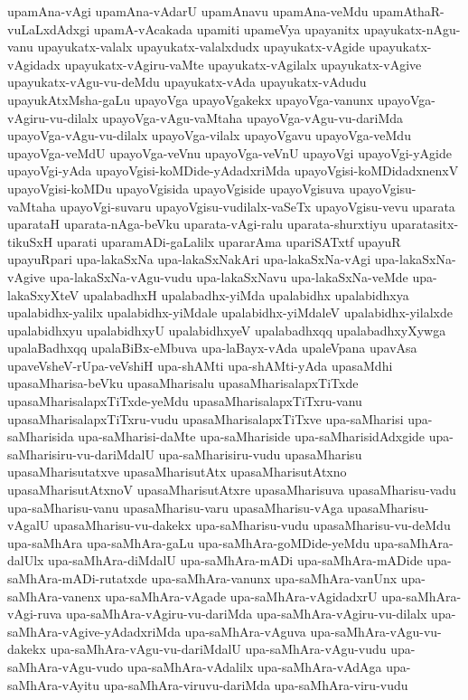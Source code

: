 {upamAna-vAgi
upamAna-vAdarU
upamAnavu
upamAna-veMdu
upamAthaR-vuLaLxdAdxgi
upamA-vAcakada
upamiti
upameVya
upayanitx
upayukatx-nAgu-vanu
upayukatx-valalx
upayukatx-valalxdudx
upayukatx-vAgide
upayukatx-vAgidadx
upayukatx-vAgiru-vaMte
upayukatx-vAgilalx
upayukatx-vAgive
upayukatx-vAgu-vu-deMdu
upayukatx-vAda
upayukatx-vAdudu
upayukAtxMsha-gaLu
upayoVga
upayoVgakekx
upayoVga-vanunx
upayoVga-vAgiru-vu-dilalx
upayoVga-vAgu-vaMtaha
upayoVga-vAgu-vu-dariMda
upayoVga-vAgu-vu-dilalx
upayoVga-vilalx
upayoVgavu
upayoVga-veMdu
upayoVga-veMdU
upayoVga-veVnu
upayoVga-veVnU
upayoVgi
upayoVgi-yAgide
upayoVgi-yAda
upayoVgisi-koMDide-yAdadxriMda
upayoVgisi-koMDidadxnenxV
upayoVgisi-koMDu
upayoVgisida
upayoVgiside
upayoVgisuva
upayoVgisu-vaMtaha
upayoVgi-suvaru
upayoVgisu-vudilalx-vaSeTx
upayoVgisu-vevu
uparata
uparataH
uparata-nAga-beVku
uparata-vAgi-ralu
uparata-shurxtiyu
uparatasitx-tikuSxH
uparati
uparamADi-gaLalilx
upararAma
upariSATxtf
upayuR
upayuRpari
upa-lakaSxNa
upa-lakaSxNakAri
upa-lakaSxNa-vAgi
upa-lakaSxNa-vAgive
upa-lakaSxNa-vAgu-vudu
upa-lakaSxNavu
upa-lakaSxNa-veMde
upa-lakaSxyXteV
upalabadhxH
upalabadhx-yiMda
upalabidhx
upalabidhxya
upalabidhx-yalilx
upalabidhx-yiMdale
upalabidhx-yiMdaleV
upalabidhx-yilalxde
upalabidhxyu
upalabidhxyU
upalabidhxyeV
upalabadhxqq
upalabadhxyXywga
upalaBadhxqq
upalaBiBx-eMbuva
upa-laBayx-vAda
upaleVpana
upavAsa
upaveVsheV-rUpa-veVshiH
upa-shAMti
upa-shAMti-yAda
upasaMdhi
upasaMharisa-beVku
upasaMharisalu
upasaMharisalapxTiTxde
upasaMharisalapxTiTxde-yeMdu
upasaMharisalapxTiTxru-vanu
upasaMharisalapxTiTxru-vudu
upasaMharisalapxTiTxve
upa-saMharisi
upa-saMharisida
upa-saMharisi-daMte
upa-saMhariside
upa-saMharisidAdxgide
upa-saMharisiru-vu-dariMdalU
upa-saMharisiru-vudu
upasaMharisu
upasaMharisutatxve
upasaMharisutAtx
upasaMharisutAtxno
upasaMharisutAtxnoV
upasaMharisutAtxre
upasaMharisuva
upasaMharisu-vadu
upa-saMharisu-vanu
upasaMharisu-varu
upasaMharisu-vAga
upasaMharisu-vAgalU
upasaMharisu-vu-dakekx
upa-saMharisu-vudu
upasaMharisu-vu-deMdu
upa-saMhAra
upa-saMhAra-gaLu
upa-saMhAra-goMDide-yeMdu
upa-saMhAra-dalUlx
upa-saMhAra-diMdalU
upa-saMhAra-mADi
upa-saMhAra-mADide
upa-saMhAra-mADi-rutatxde
upa-saMhAra-vanunx
upa-saMhAra-vanUnx
upa-saMhAra-vanenx
upa-saMhAra-vAgade
upa-saMhAra-vAgidadxrU
upa-saMhAra-vAgi-ruva
upa-saMhAra-vAgiru-vu-dariMda
upa-saMhAra-vAgiru-vu-dilalx
upa-saMhAra-vAgive-yAdadxriMda
upa-saMhAra-vAguva
upa-saMhAra-vAgu-vu-dakekx
upa-saMhAra-vAgu-vu-dariMdalU
upa-saMhAra-vAgu-vudu
upa-saMhAra-vAgu-vudo
upa-saMhAra-vAdalilx
upa-saMhAra-vAdAga
upa-saMhAra-vAyitu
upa-saMhAra-viruvu-dariMda
upa-saMhAra-viru-vudu
}
